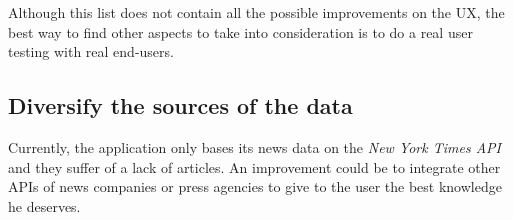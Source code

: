 Although this list does not contain all the possible improvements on the UX, the best way to find other aspects to take into consideration is to do a real user testing with real end-users.

\subsection{Diversify the sources of the data}
Currently, the application only bases its news data on the \textit{New York Times API} and they suffer of a lack of articles. An improvement could be to integrate other APIs of news companies or press agencies to give to the user the best knowledge he deserves.
